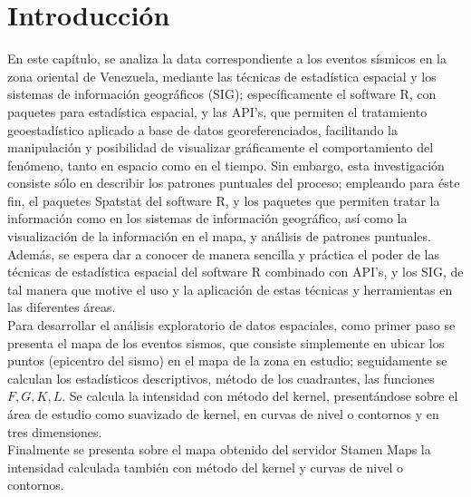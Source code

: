 \documentclass[12pt]{report}
\begin{document}
{{{{{{{{{{{{{{		
		\section*{Introducción}
		
		En este capítulo, se analiza la data correspondiente a los eventos sísmicos en la zona oriental de Venezuela, mediante las técnicas de estadística espacial y los sistemas de información geográficos (SIG); específicamente el software  R,  con  paquetes para estadística espacial, y las API's,  que permiten el tratamiento geoestadístico aplicado a base de datos georeferenciados, facilitando la manipulación y posibilidad de visualizar gráficamente el comportamiento del fenómeno, tanto en espacio como en el tiempo. Sin embargo, esta investigación consiste sólo en describir  los patrones puntuales del proceso; empleando para éste fin, el paquetes Spatstat del software R, y los paquetes que  permiten tratar la información como en los sistemas de información geográfico, así como la visualización de  la información en el mapa, y análisis de patrones puntuales. \\
		
		Además, se espera dar a conocer de manera sencilla y práctica el poder de las técnicas de estadística espacial del software R combinado con  API's, y  los SIG, de tal manera que motive el uso y la  aplicación de estas técnicas y herramientas en las diferentes áreas. \\
		
		
		
		Para desarrollar el análisis exploratorio de datos espaciales, como primer paso se presenta el mapa de los eventos sismos, que consiste simplemente en ubicar los puntos (epicentro del sismo) en el mapa de la zona en estudio;  seguidamente se calculan los estadísticos descriptivos,  método de los cuadrantes, las funciones $F, G, K, L$.  Se calcula la intensidad con método del kernel, presentándose sobre el área de estudio como suavizado de kernel, en curvas de nivel o contornos y en tres dimensiones.\\
		
		Finalmente se presenta sobre el mapa obtenido del servidor Stamen Maps  la intensidad calculada también con método del kernel y curvas de nivel o contornos.\\
							
}}}}}}}}}}}}}}
\end{document}
